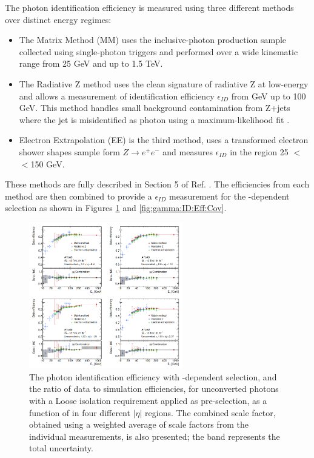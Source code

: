 The photon identification efficiency is measured using three different methods over distinct energy regimes:
\begin{itemize}
\item The Matrix Method (MM) uses the inclusive-photon production sample collected using single-photon triggers and performed over a wide kinematic range from 25 GeV and up to 1.5 TeV. 
\item The Radiative Z method uses the clean signature of radiative Z at low-energy and allows a measurement of identification efficiency $\epsilon_{ID}$ from  GeV up to 100 GeV. This method handles small background contamination from Z+jets where the jet is misidentified as photon using a maximum-likelihood fit \cite{Photon_Eff_Run1}. 
\item Electron Extrapolation (EE) is the third method, uses a transformed electron shower shapes sample form $Z\rightarrow e^+e^-$ and measures $\epsilon_{ID}$ in the region 25 $<$\eT$<$150 GeV.
\end{itemize}
These methods are fully described in Section 5 of Ref. \cite{Photon_Eff_2015}. The efficiencies from each method are then combined to provide a $\epsilon_{ID}$ measurement for the \eT-dependent selection as shown in Figures \ref{fig:gamma:ID:Eff:UnCov} and \ref{fig:gamma:ID:Eff:Cov}. 
\begin{figure}[htbp]
    \centering
    \includegraphics[width=0.6\textwidth]{Ch3/Img/Unconverted_Eff_2017.png}
    \caption{The photon identification efficiency with \eT-dependent selection, and the ratio of data to simulation efficiencies, for unconverted photons with a Loose isolation requirement applied as pre-selection, as a function of \eT in four different $|\eta|$ regions. The combined scale factor, obtained using a weighted average of scale factors from the individual measurements, is also presented; the band represents the total uncertainty.}
    \label{fig:gamma:ID:Eff:UnCov}
\end{figure}

